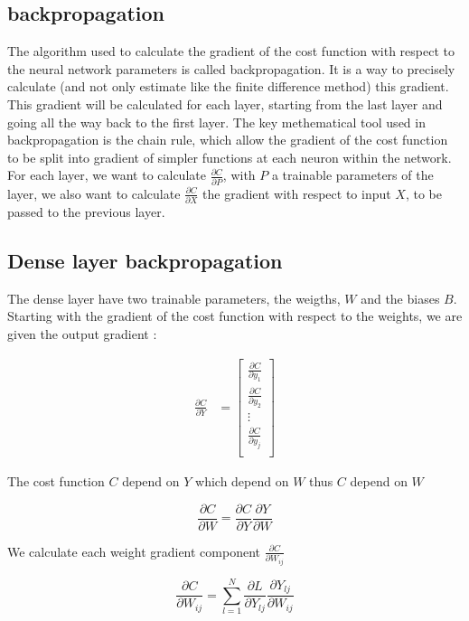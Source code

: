 \documentclass[a4paper, twocolumn, twoside]{article}
\begin{document}
	\subsection{backpropagation}

	The algorithm used to calculate the gradient of the cost function with respect to the neural network parameters
	is called backpropagation. It is a way to precisely calculate
	(and not only estimate like the finite difference method) this gradient.
	This gradient will be calculated for each layer,
	starting from the last layer and going all the way back to the first layer.
	The key methematical tool used in backpropagation is the chain rule,
	which allow the gradient of the cost function
	to be split into gradient of simpler functions at each neuron within the network.
	For each layer, we want to calculate $\frac{\partial C}{\partial P}$, with $P$ a trainable parameters of the layer,
	we also want to calculate $\frac{\partial C}{\partial X}$ the gradient with respect to input $X$, to be passed to the previous layer.

	\subsection{Dense layer backpropagation}

	The dense layer have two trainable parameters, the weigths, $W$ and the biases $B$.
	Starting with the gradient of the cost function with respect to the weights, we are given
	the output gradient :

	\begin{align}
		\frac{\partial C}{\partial Y} &= \begin{bmatrix}
		\frac{\partial C}{\partial y_1} \\
		\frac{\partial C}{\partial y_2} \\
        \vdots \\
	   \frac{\partial C}{\partial y_j} \\
	\end{bmatrix}
	\end{align}

	The cost function $C$ depend on $Y$ which depend on $W$ thus $C$ depend on $W$

	$$
    \frac{\partial C}{\partial W} = \frac{\partial C}{\partial Y} \frac{\partial Y}{\partial W}
	$$

	We calculate each weight gradient component $\frac{\partial C }{\partial W_{ij}}$

	$$
    \frac{\partial C}{\partial W_{ij}} = \sum_{l=1}^{N} \frac{\partial L}{\partial Y_{lj}} \frac{\partial Y_{lj}}{\partial W_{ij}}
	$$
\end{document}
